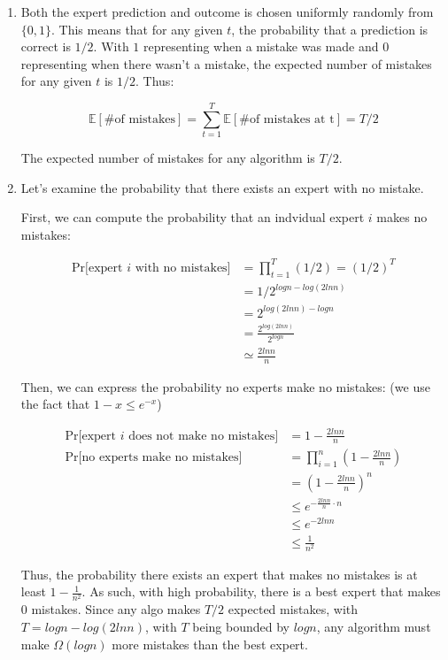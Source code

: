 \documentclass[11pt]{article}
\theoremstyle{definition}
\theoremstyle{case}
\theoremstyle{theorem}
\begin{document}
\begin{enumerate}[label=(\alph*)]

\item Both the expert prediction and outcome is chosen uniformly randomly from $\{0, 1\}$. 
This means that for any given $t$, the probability that a prediction is correct is $1/2$. With
$1$ representing when a mistake was made and $0$ representing when there wasn't a mistake, the
expected number of mistakes for any given $t$ is $1/2$. Thus: 

\[
  \mathbb{E}[\text{\# of mistakes}] = \sum_{t = 1}^T \mathbb{E}[\text{\# of mistakes at t}] = T/2
\]

The expected number of mistakes for any algorithm is $T/2$.

\item Let's examine the probability that there exists an expert with no mistake.

First, we can compute the probability that an indvidual expert $i$ makes no mistakes:

\begin{align*}
  \text{Pr[expert $i$ with no mistakes]} &= \prod_{t=1}^T (1/2) = (1/2)^T \\
                                         &= 1/2^{log n - log(2 ln n)} \\
                                         &= 2^{log(2 ln n) - log n} \\
                                         &= \frac{2^{log(2 ln n)}}{2^{log n}} \\
                                         &\simeq \frac{2 ln n}{n}
\end{align*}

Then, we can express the probability no experts make no mistakes: (we use the fact that $1 - x \leq e^{-x}$)

\begin{align*}
  \text{Pr[expert $i$ does not make no mistakes]} &= 1 - \frac{2 ln n}{n} \\
  \text{Pr[no experts make no mistakes]} &= \prod_{i=1}^n (1 - \frac{2 ln n}{n}) \\
                                         &= (1 - \frac{2 ln n}{n})^n \\
                                         &\leq e^{-\frac{2 ln n}{n} \cdot n} \\
                                         &\leq e^{-2 ln n} \\
                                         &\leq \frac{1}{n^2}
\end{align*}

Thus, the probability there exists an expert that makes no mistakes is at least $1 - \frac{1}{n^2}$. 
As such, with high probability, there is a best expert that makes $0$ mistakes. Since any algo 
makes $T/2$ expected mistakes, with $T = log n - log(2 ln n)$, with $T$ being bounded by $log n$, 
any algorithm must make $\Omega(log n)$ more mistakes than the best expert.

\end{enumerate}
\end{document}
